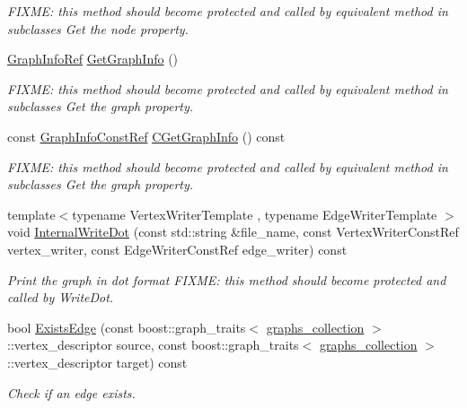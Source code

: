 \begin{DoxyCompactItemize}
\begin{DoxyCompactList}\small\item\em F\+I\+X\+ME\+: this method should become protected and called by equivalent method in subclasses Get the node property. \end{DoxyCompactList}\item 
\hyperlink{graph__info_8hpp_a4a5c364c379e5139b7dc97e7e69c7da3}{Graph\+Info\+Ref} \hyperlink{structgraph_a09feef618b21029c29d8635a7dedecdf}{Get\+Graph\+Info} ()
\begin{DoxyCompactList}\small\item\em F\+I\+X\+ME\+: this method should become protected and called by equivalent method in subclasses Get the graph property. \end{DoxyCompactList}\item 
const \hyperlink{graph__info_8hpp_a702acdabd1425f04d03069d60d5d56e2}{Graph\+Info\+Const\+Ref} \hyperlink{structgraph_a5e08b475b11e2ae0a451c3834a2f2e7b}{C\+Get\+Graph\+Info} () const
\begin{DoxyCompactList}\small\item\em F\+I\+X\+ME\+: this method should become protected and called by equivalent method in subclasses Get the graph property. \end{DoxyCompactList}\item 
{\footnotesize template$<$typename Vertex\+Writer\+Template , typename Edge\+Writer\+Template $>$ }\\void \hyperlink{structgraph_a24c83ec9ba37418544b91904a92d5f08}{Internal\+Write\+Dot} (const std\+::string \&file\+\_\+name, const Vertex\+Writer\+Const\+Ref vertex\+\_\+writer, const Edge\+Writer\+Const\+Ref edge\+\_\+writer) const
\begin{DoxyCompactList}\small\item\em Print the graph in dot format F\+I\+X\+ME\+: this method should become protected and called by Write\+Dot. \end{DoxyCompactList}\item 
bool \hyperlink{structgraph_aff86ad7c5fb14a29be2013610985ef8e}{Exists\+Edge} (const boost\+::graph\+\_\+traits$<$ \hyperlink{structgraphs__collection}{graphs\+\_\+collection} $>$\+::vertex\+\_\+descriptor source, const boost\+::graph\+\_\+traits$<$ \hyperlink{structgraphs__collection}{graphs\+\_\+collection} $>$\+::vertex\+\_\+descriptor target) const
\begin{DoxyCompactList}\small\item\em Check if an edge exists. \end{DoxyCompactList}\item 

\end{DoxyCompactItemize}
